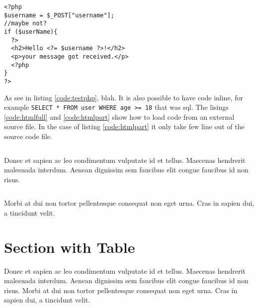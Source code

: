 \begin{code}
  \begin{verbatim}
<?php
$username = $_POST["username"];
//maybe not?
if ($userName){
  ?>
  <h2>Hello <?= $username ?>!</h2>
  <p>your message got received.</p>
  <?php
}
?>
\end{verbatim}
  \label{code:testphp}
\end{code}


As see in listing \ref{code:testphp}, blah. It is also possible to have code inline, for example \texttt{SELECT * FROM user WHERE age >= 18} that was \gls{sql}.
The lisings \ref{code:htmlfull} and \ref{code:htmlpart} show how to load code from an external source file. In the case of listing \ref{code:htmlpart} it only take few line out of the source code file.

\begin{code}
  \inputminted{html}{code/html5_sample.html}
  \label{code:htmlfull}
\end{code}
 Donec et sapien ac leo condimentum vulputate id et tellus. Maecenas hendrerit malesuada interdum. Aenean dignissim sem faucibus elit congue faucibus id non risus.

 \begin{code}
   \inputminted[firstline=3,lastline=6]{html}{code/html5_sample.html}
  \label{code:htmlpart}
\end{code}


 Morbi at dui non tortor pellentesque consequat non eget urna. Cras in sapien dui, a tincidunt velit.


\section{Section with Table}
Donec et sapien ac leo condimentum vulputate id et tellus. Maecenas hendrerit malesuada interdum. Aenean dignissim sem faucibus elit congue faucibus id non risus. Morbi at dui non tortor pellentesque consequat non eget urna. Cras in sapien dui, a tincidunt velit.

